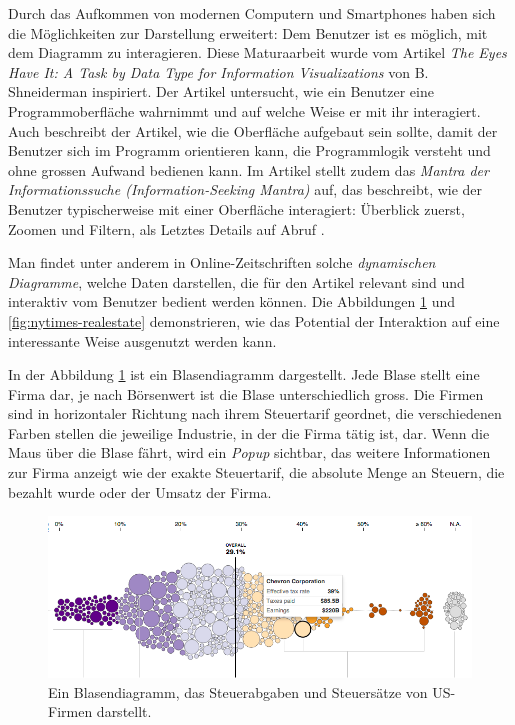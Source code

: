 Durch das Aufkommen von modernen Computern und Smartphones haben sich die Möglichkeiten zur Darstellung erweitert: Dem Benutzer ist es möglich, mit dem Diagramm zu interagieren. Diese Maturaarbeit wurde vom Artikel \textit{The Eyes Have It: A Task by Data Type for Information Visualizations} von B. Shneiderman \cite{shneiderman} inspiriert. Der Artikel untersucht, wie ein Benutzer eine Programmoberfläche wahrnimmt und auf welche Weise er mit ihr interagiert. Auch beschreibt der Artikel, wie die Oberfläche aufgebaut sein sollte, damit der Benutzer sich im Programm orientieren kann, die Programmlogik versteht und ohne grossen Aufwand bedienen kann. Im Artikel stellt \citeauthor{shneiderman} zudem das \textit{Mantra der Informationssuche (Information-Seeking Mantra)} auf, das beschreibt, wie der Benutzer typischerweise mit einer Oberfläche interagiert: Überblick zuerst, Zoomen und Filtern, als Letztes Details auf Abruf \cite{shneiderman}.

Man findet unter anderem in Online-Zeitschriften solche \textit{dynamischen Diagramme}, welche Daten darstellen, die für den Artikel relevant sind und interaktiv vom Benutzer bedient werden können. Die Abbildungen \ref{fig:nytimes-taxes} und \ref{fig:nytimes-realestate} demonstrieren, wie das Potential der Interaktion auf eine interessante Weise ausgenutzt werden kann.

In der Abbildung \ref{fig:nytimes-taxes} ist ein Blasendiagramm dargestellt. Jede Blase stellt eine Firma dar, je nach Börsenwert ist die Blase unterschiedlich gross. Die Firmen sind in horizontaler Richtung nach ihrem Steuertarif geordnet, die verschiedenen Farben stellen die jeweilige Industrie, in der die Firma tätig ist, dar. Wenn die Maus über die Blase fährt, wird ein \textit{Popup} sichtbar, das weitere Informationen zur Firma anzeigt wie der exakte Steuertarif, die absolute Menge an Steuern, die bezahlt wurde oder der Umsatz der Firma.

\begin{figure}[H]
	\centering
	\includegraphics[width=\linewidth]{images/nytimes-taxes-zugeschnitten}
	\caption[Blasendiagramm in The New York Times ()]{Ein Blasendiagramm, das Steuerabgaben und Steuersätze von US-Firmen darstellt. \cite{nytimes-taxes}}
	\label{fig:nytimes-taxes}
\end{figure}

